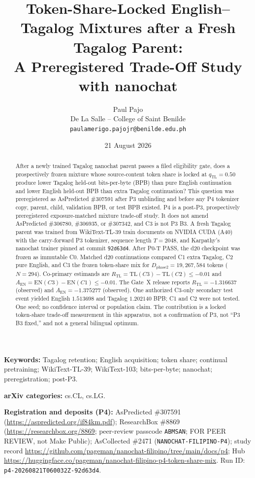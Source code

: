 \documentclass[11pt,a4paper]{article}
\title{Token-Share-Locked English--Tagalog Mixtures after a Fresh Tagalog Parent:\\
\large A Preregistered Trade-Off Study with nanochat}
\author{Paul Pajo\\
De La Salle -- College of Saint Benilde\\
\texttt{paulamerigo.pajojr@benilde.edu.ph}}
\date{21 August 2026}
\begin{document}
\maketitle

\begin{abstract}
After a newly trained Tagalog nanochat parent passes a filed eligibility gate, does a prospectively frozen mixture whose source-content token share is locked at $q_{\mathrm{TL}}=0.50$ produce lower Tagalog held-out bits-per-byte (BPB) than pure English continuation and lower English held-out BPB than extra Tagalog continuation? This question was preregistered as AsPredicted \#307591 after P3 unblinding and before any P4 tokenizer copy, parent, child, validation BPB, or test BPB existed. P4 is a post-P3, prospectively preregistered exposure-matched mixture trade-off study. It does not amend AsPredicted \#306780, \#306935, or \#307342, and C3 is not P3 B3. A fresh Tagalog parent was trained from WikiText-TL-39 train documents on NVIDIA CUDA (A40) with the carry-forward P3 tokenizer, sequence length $T=2048$, and Karpathy's nanochat trainer pinned at commit \texttt{92d63d4}. After P0-T PASS, the d20 checkpoint was frozen as immutable C0. Matched d20 continuations compared C1 extra Tagalog, C2 pure English, and C3 the frozen token-share mix for $D_{\mathrm{phase2}}=19{,}267{,}584$ tokens ($N=294$). Co-primary estimands are $R_{\mathrm{TL}}=\mathrm{TL}(C3)-\mathrm{TL}(C2)\le -0.01$ and $A_{\mathrm{EN}}=\mathrm{EN}(C3)-\mathrm{EN}(C1)\le -0.01$. The Gate~X release reports $R_{\mathrm{TL}}=-1.316637$ (observed) and $A_{\mathrm{EN}}=-1.375277$ (observed). One authorized C3-only secondary test event yielded English $1.513698$ and Tagalog $1.202140$ BPB; C1 and C2 were not tested. One seed; no confidence interval or population claim. The contribution is a locked token-share trade-off measurement in this apparatus, not a confirmation of P3, not ``P3 B3 fixed,'' and not a general bilingual optimum.
\end{abstract}

\noindent\textbf{Keywords:} Tagalog retention; English acquisition; token share; continual pretraining; WikiText-TL-39; WikiText-103; bits-per-byte; nanochat; preregistration; post-P3.

\noindent\textbf{arXiv categories:} cs.CL, cs.LG.

\noindent\textbf{Registration and deposits (P4):} AsPredicted \#307591 (\url{https://aspredicted.org/if84km.pdf}); ResearchBox \#8869 (\url{https://researchbox.org/8869}; peer-review passcode \texttt{ABMSAN}; FOR PEER REVIEW, not Make Public); AsCollected \#2471 (\texttt{NANOCHAT-FILIPINO-P4}); study record \url{https://github.com/pageman/nanochat-filipino/tree/main/docs/p4}; Hub \url{https://huggingface.co/pageman/nanochat-filipino-p4-token-share-mix}. Run ID: \texttt{p4-20260821T060032Z-92d63d4}.
\end{document}
